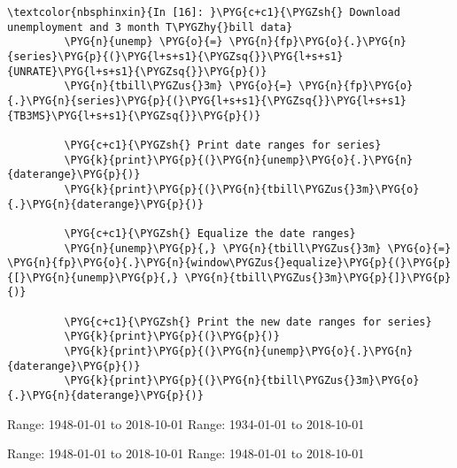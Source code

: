 \documentclass[letterpaper,10pt,openany,oneside,english]{sphinxmanual}
\begin{document}
%
\begin{Verbatim}[commandchars=\\\{\}]
\textcolor{nbsphinxin}{In [16]: }\PYG{c+c1}{\PYGZsh{} Download unemployment and 3 month T\PYGZhy{}bill data}
         \PYG{n}{unemp} \PYG{o}{=} \PYG{n}{fp}\PYG{o}{.}\PYG{n}{series}\PYG{p}{(}\PYG{l+s+s1}{\PYGZsq{}}\PYG{l+s+s1}{UNRATE}\PYG{l+s+s1}{\PYGZsq{}}\PYG{p}{)}
         \PYG{n}{tbill\PYGZus{}3m} \PYG{o}{=} \PYG{n}{fp}\PYG{o}{.}\PYG{n}{series}\PYG{p}{(}\PYG{l+s+s1}{\PYGZsq{}}\PYG{l+s+s1}{TB3MS}\PYG{l+s+s1}{\PYGZsq{}}\PYG{p}{)}
         
         \PYG{c+c1}{\PYGZsh{} Print date ranges for series}
         \PYG{k}{print}\PYG{p}{(}\PYG{n}{unemp}\PYG{o}{.}\PYG{n}{daterange}\PYG{p}{)}
         \PYG{k}{print}\PYG{p}{(}\PYG{n}{tbill\PYGZus{}3m}\PYG{o}{.}\PYG{n}{daterange}\PYG{p}{)}
         
         \PYG{c+c1}{\PYGZsh{} Equalize the date ranges}
         \PYG{n}{unemp}\PYG{p}{,} \PYG{n}{tbill\PYGZus{}3m} \PYG{o}{=} \PYG{n}{fp}\PYG{o}{.}\PYG{n}{window\PYGZus{}equalize}\PYG{p}{(}\PYG{p}{[}\PYG{n}{unemp}\PYG{p}{,} \PYG{n}{tbill\PYGZus{}3m}\PYG{p}{]}\PYG{p}{)}
         
         \PYG{c+c1}{\PYGZsh{} Print the new date ranges for series}
         \PYG{k}{print}\PYG{p}{(}\PYG{p}{)}
         \PYG{k}{print}\PYG{p}{(}\PYG{n}{unemp}\PYG{o}{.}\PYG{n}{daterange}\PYG{p}{)}
         \PYG{k}{print}\PYG{p}{(}\PYG{n}{tbill\PYGZus{}3m}\PYG{o}{.}\PYG{n}{daterange}\PYG{p}{)}
\end{Verbatim}



%
\begin{OriginalVerbatim}[commandchars=\\\{\}]
Range: 1948-01-01 to 2018-10-01
Range: 1934-01-01 to 2018-10-01

Range: 1948-01-01 to 2018-10-01
Range: 1948-01-01 to 2018-10-01
\end{OriginalVerbatim}
\relax
\end{document}
